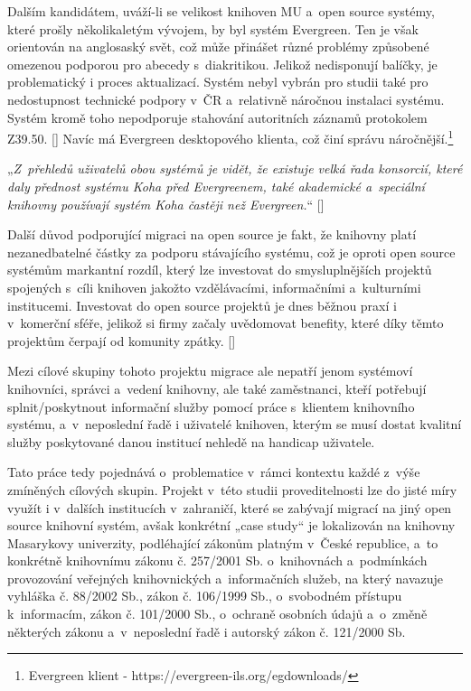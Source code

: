 \documentclass[
	11pt, oneside, printed, final, palatino, monochrome
	microtype,
	table,   %
	lof,     %
	lot     %
]{fithesis3}
\makeatletter
\newcommand{\citepages}[2]{[\cite[#1]{#2}]}
\newcommand{\citesource}[1]{[\cite{#1}]}
\newcommand{\citace}[1]{„\textit{#1}“} %
\newcommand{\mezera}{\bigskip}
\makeatother
\begin{document}
{Dalším kandidátem, uváží-li se velikost knihoven MU a~open source systémy, které prošly několikaletým vývojem, by byl systém Evergreen. Ten je však orientován na anglosaský svět, což může přinášet různé problémy způsobené omezenou podporou pro abecedy s~diakritikou. Jelikož nedisponují balíčky, je problematický i proces aktualizací. 
 Systém nebyl vybrán pro studii také pro nedostupnost technické podpory v~ČR a~relativně náročnou instalaci %
  systému. Systém kromě toho nepodporuje stahování autoritních záznamů protokolem Z39.50. \citepages{10-14}{denar_2015}
 Navíc má Evergreen desktopového klienta, což činí správu náročnější.\footnote{Evergreen klient - https://evergreen-ils.org/egdownloads/}
 
 \mezera
 \citace{Z~přehledů uživatelů obou systémů je vidět, že existuje velká řada konsorcií, které daly přednost systému Koha před Evergreenem, také akademické a~speciální knihovny používají systém Koha častěji než Evergreen.} \citesource{zabickova_2014}
 \mezera

Další důvod podporující migraci na open source je fakt, že knihovny platí nezanedbatelné částky za podporu stávajícího systému, což je oproti open source systémům markantní rozdíl, který lze investovat do smysluplnějších projektů spojených s~cíli knihoven jakožto vzdělávacími, informačními a~kulturními institucemi. Investovat do open source projektů je dnes běžnou praxí i v~komerční sféře, jelikož si firmy začaly uvědomovat benefity, které díky těmto projektům čerpají od komunity zpátky. \citepages{129-132}{Fogel2012}

Mezi cílové skupiny tohoto projektu migrace ale nepatří jenom systémoví knihovníci, správci a~vedení knihovny, ale také zaměstnanci, kteří potřebují splnit/poskytnout informační služby pomocí práce s~klientem knihovního systému, a~v~neposlední řadě i uživatelé knihoven, kterým se musí dostat kvalitní služby poskytované danou institucí nehledě na handicap uživatele.

Tato práce tedy pojednává o~problematice v~rámci kontextu každé z~výše zmíněných cílových skupin. Projekt v~této studii proveditelnosti lze do jisté míry využít i v~dalších institucích v~zahraničí, které se zabývají migrací na jiný open source knihovní systém, avšak konkrétní „case study“ je lokalizován na knihovny Masarykovy univerzity, podléhající zákonům platným v~České republice, a~to konkrétně knihovnímu zákonu č. 257/2001 Sb. o~knihovnách a~podmínkách provozování veřejných knihovnických a~informačních služeb, na který navazuje vyhláška č. 88/2002 Sb., zákon č. 106/1999 Sb., o~svobodném přístupu k~informacím, zákon č. 101/2000 Sb., o~ochraně osobních údajů a~o~změně některých zákonu a~v~neposlední řadě i autorský zákon č. 121/2000 Sb.

}
\end{document}
